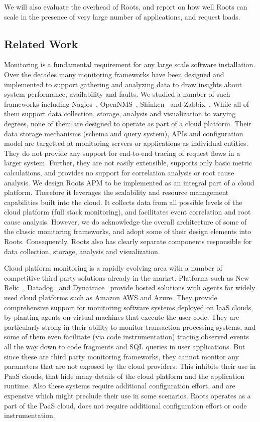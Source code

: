 We will also evaluate the overhead of Roots, and report on how well Roots can
scale in the presence of very large number of applications, and request loads.

\subsection{Related Work}
Monitoring is a fundamental requirement for any large scale software installation.
Over the decades many monitoring frameworks have been designed and implemented to
support gathering and analyzing data to draw insights about system performance,
availability and faults. We studied a number of such frameworks including Nagios~\cite{nagios},
OpenNMS~\cite{opennms}, Shinken~\cite{shinken} and Zabbix~\cite{zabbix}. 
While all of them support data collection, storage,
analysis and visualization to varying degrees, none of them are designed
to operate as part of a cloud platform. Their data storage mechanisms (schema and query system),
APIs and configuration model are targetted at monitoring servers or 
applications as individual entities. They do not provide any support for
end-to-end tracing of request flows in a larger system. Further, they are not easily extensible,
supports only basic metric calculations, and provides no support for correlation
analysis or root cause analysis. We design Roots APM to be implemented as an integral
part of a cloud platform. Therefore it leverages the scalability and resource
management capabilities built into the cloud. It collects data from all
possible levels of the cloud platform (full stack monitoring), and facilitates
event correlation and root cause analysis. However, we do acknowledge the
overall architecture of some of the classic monitoring frameworks, and
adopt some of their design elements into Roots. Consequently, Roots also
has clearly separate components responsible for data collection, storage, analysis
and visualization.

Cloud platform monitoring is a rapidly evolving area with a number of 
competitive third party solutions already in the market. Platforms such
as New Relic~\cite{newrelic}, Datadog~\cite{datadog} and Dynatrace~\cite{dynatrace} 
provide hosted solutions with
agents for widely used cloud platforms such as Amazon AWS and Azure.
They provide comprehensive support for monitoring software
systems deployed on IaaS clouds, by planting agents on virtual
machines that execute the user code.
They are particularly strong in their ability to monitor transaction
processing systems, and some of them even facilitate (via code instrumentation) 
tracing observed events all the way down to code fragments and 
SQL queries in user applications.
But since these are third party monitoring frameworks, they cannot
monitor any parameters that are not exposed by the
cloud providers. This inhibits their use in PaaS clouds, that hide
many details of the cloud platform and the application runtime.  
Also these systems require additional configuration effort, and are expensive
which might preclude their use in some scenarios. Roots operates as a part
of the PaaS cloud, does not require additional configuration effort or code
instrumentation.

